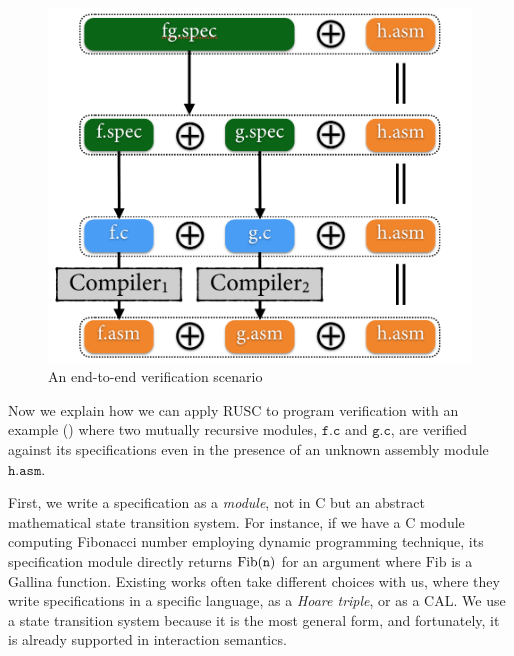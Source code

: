 \begin{figure}[t]
\centerline{\includegraphics[width=0.90\linewidth]{images/program-verif.png}}
\caption{An end-to-end verification scenario}
\label{fig:program-verif}
\end{figure}



Now we explain how we can apply RUSC to program verification with an example () where two mutually recursive modules, $\texttt{f.c}$ and $\texttt{g.c}$, are verified against its specifications even in the presence of an unknown assembly module $\texttt{h.asm}$.

First, we write a specification as a {\it module}, not in C but an abstract mathematical state transition system. %
For instance, if we have a C module computing Fibonacci number employing dynamic programming technique, its specification module directly returns $\mathrm{Fib}(\texttt{n})$ for an argument  where $\mathrm{Fib}$ is a Gallina function.
Existing works\cite{lorch:armada, jung:irisjfp, VST, gu:dscal} often take different choices with us, where they write specifications in a specific language, as a {\it Hoare triple}, or as a CAL.
We use a state transition system because it is the most general form, and fortunately, it is already supported in interaction semantics. %

